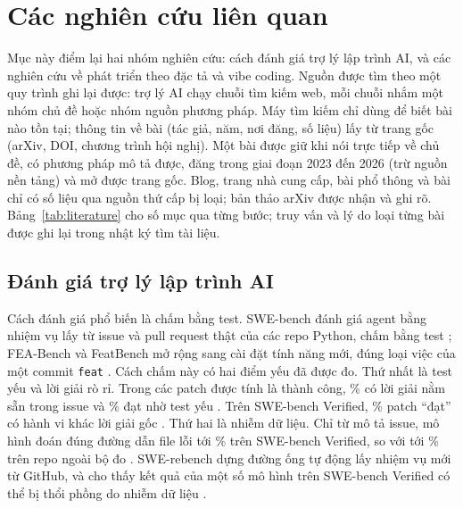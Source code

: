 \section{Các nghiên cứu liên quan}\label{sec:related-work}

Mục này điểm lại hai nhóm nghiên cứu: cách đánh giá trợ lý lập trình AI, và các nghiên cứu về phát triển
theo đặc tả và vibe coding. Nguồn được tìm theo một quy trình ghi lại được: trợ lý AI chạy
\NumLitQueries{} chuỗi tìm kiếm web, mỗi chuỗi
nhắm một nhóm chủ đề hoặc nhóm nguồn phương pháp. Máy tìm kiếm chỉ dùng để biết bài nào tồn tại; thông tin
về bài (tác giả, năm, nơi đăng, số liệu) lấy từ trang gốc (arXiv, DOI, chương trình hội nghị). Một bài
được giữ khi nói trực tiếp về chủ đề, có phương pháp mô tả được, đăng trong giai đoạn 2023 đến 2026 (trừ
nguồn nền tảng) và mở được trang gốc. Blog, trang nhà cung cấp, bài phổ thông và bài chỉ có số liệu qua
nguồn thứ cấp bị loại; bản thảo arXiv được nhận và ghi rõ. Bảng~\ref{tab:literature} cho số mục qua từng
bước; truy vấn và lý do loại từng bài được ghi lại trong nhật ký tìm tài liệu.

\begin{table}[H]
\centering\small
\caption{Số mục qua từng bước tìm tài liệu}\label{tab:literature}

\end{table}

\subsection{Đánh giá trợ lý lập trình AI}

Cách đánh giá phổ biến là chấm bằng test. SWE-bench đánh giá agent bằng \NumLitJimenezTasks{} nhiệm vụ lấy từ issue và pull request thật của các
repo Python, chấm bằng test \cite{jimenez_2024}; FEA-Bench và FeatBench mở rộng sang cài đặt tính năng mới,
đúng loại việc của một commit \texttt{feat} \cite{li_2025,chen_2025}. Cách chấm này có hai điểm yếu đã được
đo. Thứ nhất là test yếu và lời giải rò rỉ. Trong các patch được tính là thành công,
\NumLitAleithanLeakPct{}\% có lời giải nằm sẵn trong issue và \NumLitAleithanWeakPct{}\% đạt nhờ test
yếu \cite{aleithan_2024}. Trên SWE-bench Verified, \NumLitWangDiffPct{}\% patch ``đạt'' có hành vi
khác lời giải gốc \cite{wang_2025}. Thứ hai là nhiễm dữ liệu. Chỉ từ mô tả issue, mô hình đoán
đúng đường dẫn file lỗi tới \NumLitLiangPathPct{}\% trên SWE-bench Verified, so với tới
\NumLitLiangPathOtherPct{}\% trên repo ngoài bộ đo \cite{liang_2025}. SWE-rebench dựng đường ống tự động lấy
nhiệm vụ mới từ GitHub, và cho thấy kết quả của một số mô hình trên SWE-bench Verified có thể bị thổi
phồng do nhiễm dữ liệu \cite{badertdinov_2025}.

